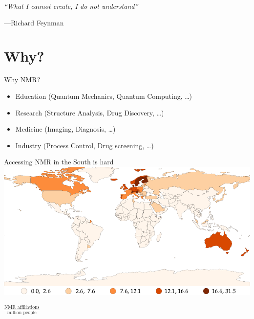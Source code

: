 \documentclass{ethpresentation}
\title{\Huge\magnethical}
\subtitle{Building a 25\,MHz NMR Spectrometer}
\date{\today}
\author{Maximilian Stabel}
\institute{ETH Zürich}
\begin{document}
\maketitle %

\begin{frame}
  \centering
  \emph{\enquote{What I cannot create, I do not understand}}

  \vspace{\baselineskip}

  \hfill{}---Richard Feynman
\end{frame}

\section{Why?}

\begin{frame}{Why NMR?}
  \begin{itemize}[<+->]
    \item Education (Quantum Mechanics, Quantum Computing, \ldots)
    \item Research (Structure Analysis, Drug Discovery, \ldots)
    \item Medicine (Imaging, Diagnosis, \ldots)
    \item Industry (Process Control, Drug screening, \dots)
  \end{itemize}
\end{frame}

\begin{frame}{Accessing NMR in the South is hard}
  \centering
  \includegraphics[height=0.8\textheight]{images/nmr-affiliations-per-million-people_naturalbreaks.pdf}

  \(\frac{\text{NMR affiliations}}{\text{million people}}\)
\end{frame}
\end{document}
